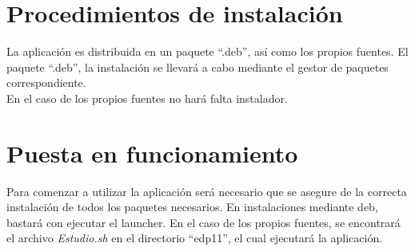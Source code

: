 \section{Procedimientos de instalación}
La aplicación es distribuida en un paquete ``.deb'', así como los propios fuentes. El paquete ``.deb'', la instalación se llevará a cabo mediante el gestor de paquetes correspondiente.\\
En el caso de los propios fuentes no hará falta instalador.

\section{Puesta en funcionamiento}
Para comenzar a utilizar la aplicación será necesario que se asegure de la correcta instalación de todos los paquetes necesarios. En instalaciones mediante deb, bastará con ejecutar el launcher. 
En el caso de los propios fuentes, se encontrará el archivo \textit{Estudio.sh} en el directorio ``edp11'', el cual ejecutará la aplicación.

